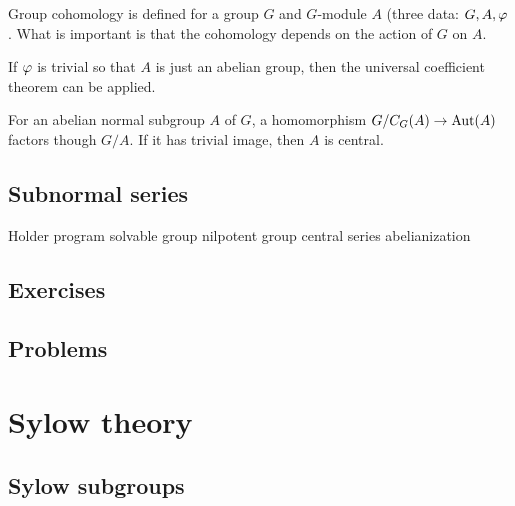 \documentclass{../../large}
\begin{document}
Group cohomology is defined for a group $G$ and $G$-module $A$ (three data: $G,A,\varphi$.
What is important is that the cohomology depends on the action of $G$ on $A$.

If $\varphi$ is trivial so that $A$ is just an abelian group, then the universal coefficient theorem can be applied.




\begin{prb}
For an abelian normal subgroup $A$ of $G$, a homomorphism $G/C_G(A)\to\operatorname{Aut}(A)$ factors though $G/A$.
If it has trivial image, then $A$ is central.
\end{prb}

\section{Subnormal series}

Holder program
solvable group
nilpotent group
central series
abelianization

\section*{Exercises}
\begin{prb}
\end{prb}

\section*{Problems}







\chapter{Sylow theory}

\section{Sylow subgroups}
\end{document}
